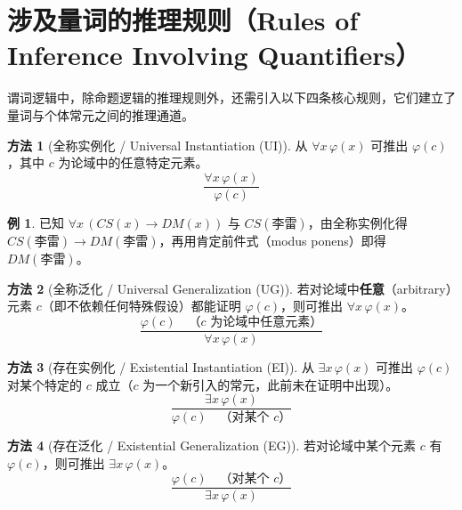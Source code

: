 \documentclass[UTF8,11pt,a4paper]{ctexbook}   %
\theoremstyle{definition}
\newtheorem{example}{例}[section]
\newtheorem{method}{方法}[section]
\begin{document}
\section{涉及量词的推理规则（Rules of Inference Involving Quantifiers）}

谓词逻辑中，除命题逻辑的推理规则外，还需引入以下四条核心规则，它们建立了量词与个体常元之间的推理通道。

\begin{method}[全称实例化 / Universal Instantiation (UI)]
从 $\forall x\,\varphi(x)$ 可推出 $\varphi(c)$，其中 $c$ 为论域中的任意特定元素。
\[
\frac{\forall x\,\varphi(x)}{\varphi(c)}
\]
\end{method}

\begin{example}
已知 $\forall x\,(CS(x)\to DM(x))$ 与 $CS(\text{李雷})$，由全称实例化得 $CS(\text{李雷})\to DM(\text{李雷})$，再用肯定前件式（modus ponens）即得 $DM(\text{李雷})$。
\end{example}

\begin{method}[全称泛化 / Universal Generalization (UG)]
若对论域中\textbf{任意}（arbitrary）元素 $c$（即不依赖任何特殊假设）都能证明 $\varphi(c)$，则可推出 $\forall x\,\varphi(x)$。
\[
\frac{\varphi(c)\quad\text{（$c$ 为论域中任意元素）}}{\forall x\,\varphi(x)}
\]
\end{method}

\begin{method}[存在实例化 / Existential Instantiation (EI)]
从 $\exists x\,\varphi(x)$ 可推出 $\varphi(c)$ 对某个特定的 $c$ 成立（$c$ 为一个新引入的常元，此前未在证明中出现）。
\[
\frac{\exists x\,\varphi(x)}{\varphi(c)\quad\text{（对某个 $c$）}}
\]
\end{method}

\begin{method}[存在泛化 / Existential Generalization (EG)]
若对论域中某个元素 $c$ 有 $\varphi(c)$，则可推出 $\exists x\,\varphi(x)$。
\[
\frac{\varphi(c)\quad\text{（对某个 $c$）}}{\exists x\,\varphi(x)}
\]
\end{method}
\end{document}
